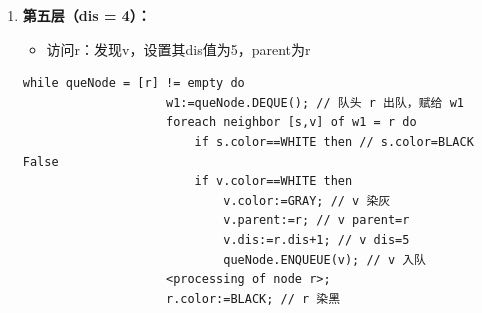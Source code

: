 \documentclass{article}
\begin{document}
\begin{enumerate}
    \pagebreak 

    \item \textbf{第五层（dis = 4）：}
    
    \begin{itemize}
        \item 访问r：发现v，设置其dis值为5，parent为r
    \end{itemize}

    \begin{lstlisting}[style=algorithmPPT]
                while queNode = [r] != empty do 
                    w1:=queNode.DEQUE(); // 队头 r 出队，赋给 w1
                    foreach neighbor [s,v] of w1 = r do
                        if s.color==WHITE then // s.color=BLACK False
                        if v.color==WHITE then 
                            v.color:=GRAY; // v 染灰
                            v.parent:=r; // v parent=r
                            v.dis:=r.dis+1; // v dis=5
                            queNode.ENQUEUE(v); // v 入队
                    <processing of node r>;
                    r.color:=BLACK; // r 染黑
        \end{lstlisting}    

    \begin{figure}[htbp]
        \begin{minipage}[b]{0.6\textwidth}    %
            \centering
\end{minipage}
\end{figure}
\end{enumerate}
\end{document}
